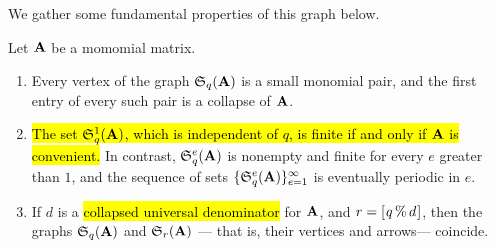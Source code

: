 \documentclass{article}
\begin{document}
We gather some fundamental properties of this graph below.

\begin{proposition}
   \label{elementary1: P}
   Let $\mathbf{A}$ be a momomial matrix.
\begin{enumerate}[$(1)$]

\item \label{elementary1 small pairs} 
Every vertex of the graph $\mathfrak{S}_{q}(\mathbf{A})$ is a small monomial pair, and the first entry of every such pair is a collapse of $\mathbf{A}$. 

\item \label{elementary1 periodic in e}
\hl{The set $\mathfrak{S}_{q}^1(\mathbf{A})$, which is independent of $q$, is finite if and only if $\mathbf{A}$ is convenient.}  In contrast, $\mathfrak{S}_{q}^e(\mathbf{A})$ is nonempty and finite for every $e$ greater than $1$, and the sequence of sets $\{ \mathfrak{S}_{q}^e(\mathbf{A}) \}_{e=1}^{\infty}$ is eventually periodic in $e$.

\item \label{elementary1 periodic in r}
If $d$ is a \hl{collapsed universal denominator} for $\mathbf{A}$, and $r= [ \hspace{.01in} q \, \% \, d \hspace{.01in} ]$, then the graphs $\mathfrak{S}_{q}(\mathbf{A})$ and $\mathfrak{S}_r(\mathbf{A})$ --- that is, their vertices {and} arrows--- coincide.
\end{enumerate}
\end{proposition}
\end{document}
